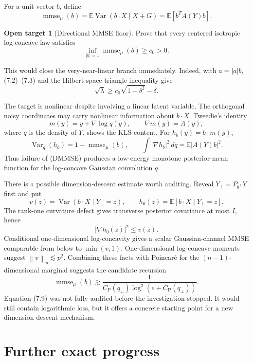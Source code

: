 \documentclass[11pt]{article}
\theoremstyle{definition}
\newtheorem{target}[theorem]{Open target}
\theoremstyle{remark}
\newcommand{\E}{\mathbb E}
\newcommand{\Var}{\operatorname{Var}}
\newcommand{\1}{\mathbf 1}
\newcommand{\CP}{C_{\mathrm P}}
\newcommand{\dd}{\,d}
\newcommand{\norm}[1]{\left\lVert #1\right\rVert}
\begin{document}
For a unit vector \(b\), define
\[
 \operatorname{mmse}_\mu(b)
 =\E\Var(b\cdot X\mid X+G)
 =\E[b^TA(Y)b].                                       \tag{7.4}
\]

\begin{target}[Directional MMSE floor]
Prove that every centered isotropic log-concave law satisfies
\[
 \boxed{\qquad
 \inf_{|b|=1}\operatorname{mmse}_\mu(b)\ge c_0>0.
 \qquad}                                              \tag{DMMSE}
\]
\end{target}

This would close the very-near-linear branch immediately.  Indeed, with
\(a=|a|b\), (7.2)--(7.3) and the Hilbert-space triangle inequality give
\[
 \sqrt\lambda
 \ge c_0\sqrt{1-\delta^2}-\delta.                    \tag{7.5}
\]

The target is nonlinear despite involving a linear latent variable.  The
orthogonal noisy coordinates may carry nonlinear information about
\(b\cdot X\).  Tweedie's identity
\[
 m(y)=y+\nabla\log q(y),\qquad \nabla m(y)=A(y),       \tag{7.6}
\]
where \(q\) is the density of \(Y\), shows the KLS content.  For
\(h_b(y)=b\cdot m(y)\),
\[
 \Var_q(h_b)=1-\operatorname{mmse}_\mu(b),
 \qquad
 \int|\nabla h_b|^2\dd q=\E|A(Y)b|^2.                \tag{7.7}
\]
Thus failure of (DMMSE) produces a low-energy monotone posterior-mean
function for the log-concave Gaussian convolution \(q\).

There is a possible dimension-descent estimate worth auditing.  Reveal
\(Y_\perp=P_{b^\perp}Y\) first and put
\[
 v(z)=\Var(b\cdot X\mid Y_\perp=z),\qquad
 h_0(z)=\E[b\cdot X\mid Y_\perp=z].
\]
The rank-one curvature defect gives transverse posterior covariance at
most \(I\), hence
\[
                         |\nabla h_0(z)|^2\le v(z).    \tag{7.8}
\]
Conditional one-dimensional log-concavity gives a scalar Gaussian-channel
MMSE comparable from below to \(\min(v,1)\).  One-dimensional log-concave
moments suggest
\(\norm v_p\lesssim p^2\).  Combining these facts with Poincar\'e for the
\((n-1)\)-dimensional marginal suggests the candidate recursion
\[
 \operatorname{mmse}_\mu(b)
 \gtrsim
 \frac{1}{\CP(q_\perp)\log^2(e+\CP(q_\perp))}.        \tag{7.9}
\]
Equation (7.9) was not fully audited before the investigation stopped.  It
would still contain logarithmic loss, but it offers a concrete starting
point for a new dimension-descent mechanism.

\section{Further exact progress}
\end{document}
